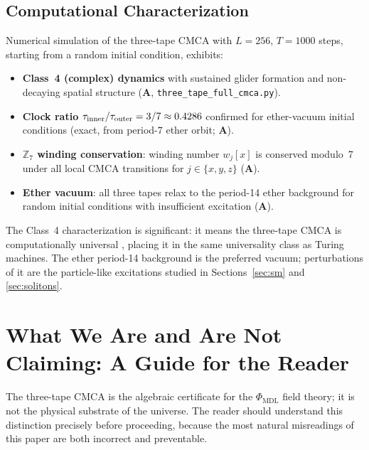 \documentclass[11pt]{article}
\theoremstyle{remark}
\newcommand{\PHIMDL}{\Phi_{\mathrm{MDL}}}
\newcommand{\ZS}{\mathbb{Z}_7}
\newcommand{\CatA}{\textbf{A}}
\newcommand{\CMCA}{\text{CMCA}}
\newcommand{\taucratio}{\tau_{\rm inner}/\tau_{\rm outer}}
\begin{document}
\subsection{Computational Characterization}

Numerical simulation of the three-tape $\CMCA$ with $L = 256$, $T = 1000$
steps, starting from a random initial condition, exhibits:

\begin{itemize}
  \item \textbf{Class~4 (complex) dynamics} with sustained glider formation
        and non-decaying spatial structure ($\CatA$,
        \texttt{three\_tape\_full\_cmca.py}).
  \item \textbf{Clock ratio} $\taucratio = 3/7 \approx 0.4286$ confirmed for
        ether-vacuum initial conditions (exact, from period-$7$ ether orbit; $\CatA$).
  \item \textbf{$\ZS$ winding conservation}: winding number $w_j[x]$ is
        conserved modulo~7 under all local $\CMCA$ transitions for
        $j \in \{x,y,z\}$ ($\CatA$).
  \item \textbf{Ether vacuum}: all three tapes relax to the period-14 ether
        background for random initial conditions with insufficient excitation
        ($\CatA$).
\end{itemize}

The Class~4 characterization is significant: it means the three-tape $\CMCA$
is computationally universal \cite{Cook2004}, placing it in the same
universality class as Turing machines. The ether period-14 background
is the preferred vacuum; perturbations of it are the particle-like excitations
studied in Sections~\ref{sec:sm} and \ref{sec:solitons}.

\FloatBarrier

\section{What We Are and Are Not Claiming: A Guide for the Reader}
\label{sec:guide}

The three-tape $\CMCA$ is the algebraic certificate for the $\PHIMDL$ field
theory; it is not the physical substrate of the universe. The reader should
understand this distinction precisely before proceeding, because the most
natural misreadings of this paper are both incorrect and preventable.
\end{document}
